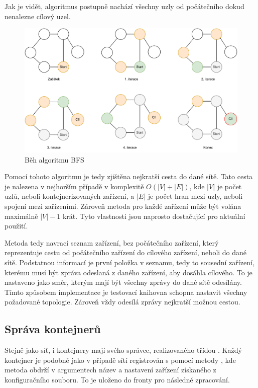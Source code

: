 Jak je vidět, algoritmus postupně nachází všechny uzly od počátečního dokud nenalezne cílový uzel. 

\begin{figure}[htbp]
    \centering 
    \includegraphics[width=\textwidth]{assets/img/bfs.pdf}
    \caption{Běh algoritmu BFS}
    \label{fig:bfs}
\end{figure}


Pomocí tohoto algoritmu je tedy zjištěna nejkratší cesta do dané sítě. Tato cesta je nalezena v nejhorším případě v komplexitě $O(|V| + |E|)$, kde $|V|$ je počet uzlů, neboli kontejnerizovaných zařízení, a $|E|$ je počet hran mezi uzly, neboli spojení mezi zařízeními. \cite{pruvodce_alogritmu} Zároveň metoda pro každé zařízení může být volána maximálně $|V| - 1$ krát. Tyto vlastnosti jsou naprosto dostačující pro aktuální použití.

Metoda tedy navrací seznam zařízení, bez počátečního zařízení, který reprezentuje cestu od počátečního zařízení do cílového zařízení, neboli do dané sítě. Podstatnou informací je první položka v seznamu, tedy to sousední zařízení, kterému musí být zpráva odeslaná z daného zařízení, aby dosáhla cílového. To je nastaveno jako směr, kterým mají být všechny zprávy do dané sítě odesílány. Tímto způsobem implementace je testovací knihovna schopna nastavit všechny požadované topologie. Zároveň vždy odesílá zprávy nejkratší možnou cestou.

\subsection{Správa kontejnerů}\label{sec:cont_managment}

Stejně jako síť, i kontejnery mají svého správce, realizovaného třídou . Každý kontejner je podobně jako v případě sítí registrován s pomocí metody , kde metoda obdrží v argumentech název a nastavení zařízení získaného z konfiguračního souboru. To je uloženo do fronty pro následné zpracování.

